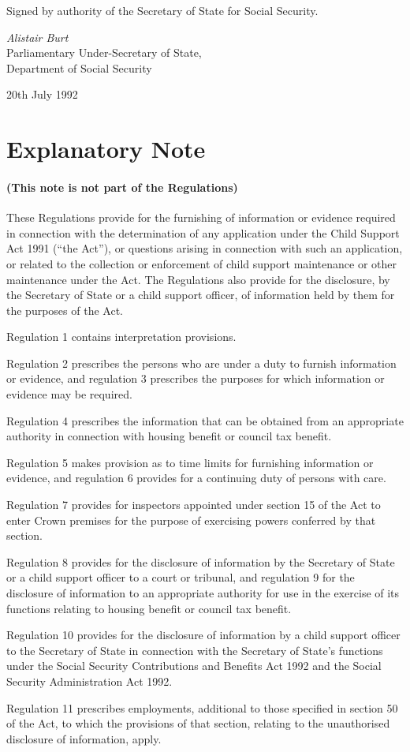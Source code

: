 \documentclass[a4paper,12pt]{article}
\begin{document}
Signed by authority of the Secretary of State for Social Security.

{\raggedleft
\emph{Alistair Burt}\\Parliamentary Under-Secretary of State,\\Department of Social Security

}

20th July 1992

\small

\part{Explanatory Note}

\renewcommand\parthead{--- Explanatory Note}

\subsection*{(This note is not part of the Regulations)}

 These Regulations provide for the furnishing of information or evidence required in connection with the determination of any application under the Child Support Act 1991 (“the Act”), or questions arising in connection with such an application, or related to the collection or enforcement of child support maintenance or other maintenance under the Act. The Regulations also provide for the disclosure, by the Secretary of State or a child support officer, of information held by them for the purposes of the Act.

  Regulation 1 contains interpretation provisions.

  Regulation 2 prescribes the persons who are under a duty to furnish information or evidence, and regulation 3 prescribes the purposes for which information or evidence may be required.

  Regulation 4 prescribes the information that can be obtained from an appropriate authority in connection with housing benefit or council tax benefit.

  Regulation 5 makes provision as to time limits for furnishing information or evidence, and regulation 6 provides for a continuing duty of persons with care.

  Regulation 7 provides for inspectors appointed under section 15 of the Act to enter Crown premises for the purpose of exercising powers conferred by that section.

  Regulation 8 provides for the disclosure of information by the Secretary of State or a child support officer to a court or tribunal, and regulation 9 for the disclosure of information to an appropriate authority for use in the exercise of its functions relating to housing benefit or council tax benefit.

  Regulation 10 provides for the disclosure of information by a child support officer to the Secretary of State in connection with the Secretary of State’s functions under the Social Security Contributions and Benefits Act 1992 and the Social Security Administration Act 1992.

  Regulation 11 prescribes employments, additional to those specified in section 50 of the Act, to which the provisions of that section, relating to the unauthorised disclosure of information, apply.
\end{document}
